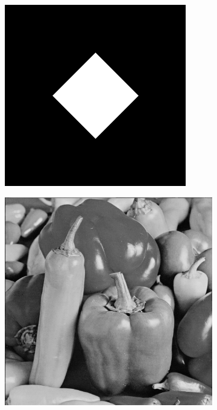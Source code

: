 \begin{figure}[htbp]
\begin{subfigure}[b]{0.2\textwidth}
    \includegraphics[width=\textwidth]{figs/fourier/square_45deg_original.png}
    \vspace*{0.02\textwidth}
  \end{subfigure}%
  \hspace*{0.02\textwidth}
  \begin{subfigure}[b]{0.2\textwidth}
    \centering
    \includegraphics[width=\textwidth]{figs/fourier/peppers_original.png}

\end{subfigure}
\end{figure}
